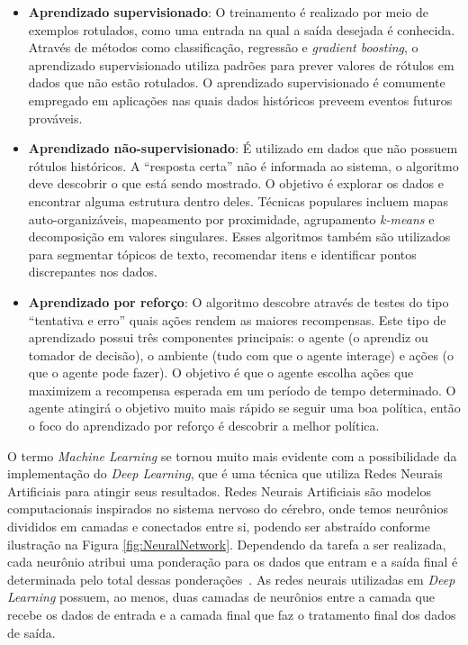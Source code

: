 \documentclass[portugues]{ic-tese}
\begin{document}
\begin{itemize}
\item \textbf{Aprendizado supervisionado}: O treinamento é realizado por meio de exemplos rotulados, como uma entrada na qual a saída desejada é conhecida. Através de métodos como classificação, regressão e \textit{gradient boosting}, o aprendizado supervisionado utiliza padrões para prever valores de rótulos em dados que não estão rotulados. O aprendizado supervisionado é comumente empregado em aplicações nas quais dados históricos preveem eventos futuros prováveis.
\item \textbf{Aprendizado não-supervisionado}: É utilizado em dados que não possuem rótulos históricos. A “resposta certa” não é informada ao sistema, o algoritmo deve descobrir o que está sendo mostrado. O objetivo é explorar os dados e encontrar alguma estrutura dentro deles. Técnicas populares incluem mapas auto-organizáveis, mapeamento por proximidade, agrupamento \textit{k-means} e decomposição em valores singulares. Esses algoritmos também são utilizados para segmentar tópicos de texto, recomendar itens e identificar pontos discrepantes nos dados.
\item \textbf{Aprendizado por reforço}: O algoritmo descobre através de testes do tipo “tentativa e erro” quais ações rendem as maiores recompensas. Este tipo de aprendizado possui três componentes principais: o agente (o aprendiz ou tomador de decisão), o ambiente (tudo com que o agente interage) e ações (o que o agente pode fazer). O objetivo é que o agente escolha ações que maximizem a recompensa esperada em um período de tempo determinado. O agente atingirá o objetivo muito mais rápido se seguir uma boa política, então o foco do aprendizado por reforço é descobrir a melhor política.
\end{itemize}

O termo \textit{Machine Learning} se tornou muito mais evidente com a possibilidade da implementação do \textit{Deep Learning}, que é uma técnica que utiliza Redes Neurais Artificiais para atingir seus resultados. Redes Neurais Artificiais são modelos computacionais inspirados no sistema nervoso do cérebro, onde temos neurônios divididos em camadas e conectados entre si, podendo ser abstraído conforme ilustração na Figura \ref{fig:NeuralNetwork}. Dependendo da tarefa a ser realizada, cada neurônio atribui uma ponderação para os dados que entram e a saída final é determinada pelo total dessas ponderações~\citep{Copeland_2016}. As redes neurais utilizadas em \textit{Deep Learning} possuem, ao menos, duas camadas de neurônios entre a camada que recebe os dados de entrada e a camada final que faz o tratamento final dos dados de saída.
\end{document}
